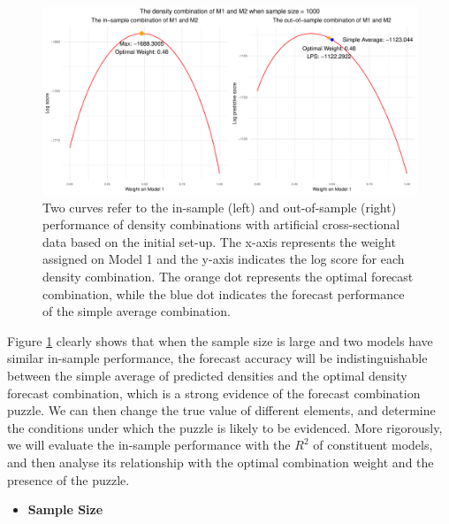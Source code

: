 \documentclass{monashthesis}
\begin{document}
\begin{figure}[ht]
\centering
\includegraphics[scale=0.6]{figures/ss_1000.pdf}
\caption{Two curves refer to the in-sample (left) and out-of-sample (right) performance of density combinations with artificial cross-sectional data based on the initial set-up. The x-axis represents the weight assigned on Model 1 and the y-axis indicates the log score for each density combination. The orange dot represents the optimal forecast combination, while the blue dot indicates the forecast performance of the simple average combination.}
\label{fig:ss1000}
\end{figure}

Figure \ref{fig:ss1000} clearly shows that when the sample size is large and two models have similar in-sample performance, the forecast accuracy will be indistinguishable between the simple average of predicted densities and the optimal density forecast combination, which is a strong evidence of the forecast combination puzzle. We can then change the true value of different elements, and determine the conditions under which the puzzle is likely to be evidenced. More rigorously, we will evaluate the in-sample performance with the \(R^2\) of constituent models, and then analyse its relationship with the optimal combination weight and the presence of the puzzle.

\begin{itemize}
\tightlist
\item
  \bf{Sample Size}
\end{itemize}
\end{document}
